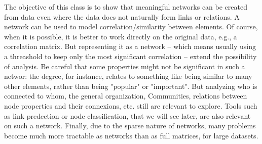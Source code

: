 \documentclass[addpoints]{exam}
\begin{document}
\begin{center}
\end{center}



\begin{tcolorbox}[colback=black!5!white,colframe=white!75!black]
The objective of this class is to show that meaningful networks can be created from data even where the data does not naturally form links or relations. A network can be used to model correlation/similarity between elements. Of course, when it is possible, it is better to work directly on the original data, e.g., a correlation matrix. But representing it as a network -- which means usually using a threashold to keep only the most significant correlation -- extend the possibility of analysis. Be careful that some properties might not be significant in such a networ: the degree, for instance, relates to something like being similar to many other elements, rather than being "popular" or "important". But analyzing who is connected to whom, the general organization, Communities, relations between node properties and their connexions, etc. still are relevant to explore. Tools such as link predection or node classification, that we will see later, are also relevant on such a network. Finally, due to the sparse nature of networks, many problems become much more tractable as networks than as full matrices, for large datasets.
\end{tcolorbox}
\end{document}
